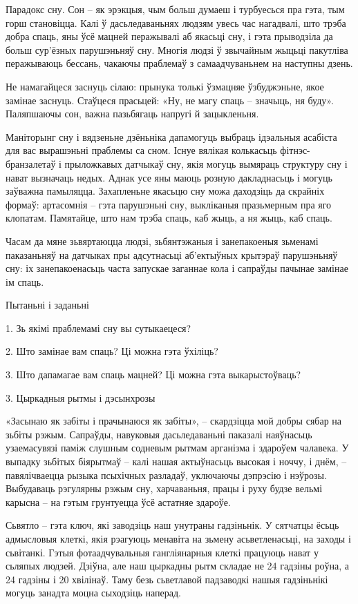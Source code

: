 Парадокс сну. Сон – як эрэкцыя, чым больш думаеш і турбуесься пра гэта, тым горш становіцца. Калі ў дасьледаваньнях людзям увесь час нагадвалі, што трэба добра спаць, яны ўсё мацней перажывалі аб якасьці сну, і гэта прыводзіла да больш сур'ёзных парушэньняў сну. Многія людзі ў звычайным жыцьці пакутліва перажываюць бессань, чакаючы праблемаў з самаадчуваньнем на наступны дзень.

Не намагайцеся заснуць сілаю: прынука толькі ўзмацняе ўзбуджэньне, якое замінае заснуць. Стаўцеся прасьцей: «Ну, не магу спаць – значыць, ня буду». Паляпшаючы сон, важна пазьбягаць напругі й зацыкленьня.

Маніторынг сну і вядзеньне дзёньніка дапамогуць выбраць ідэальныя асабіста для вас вырашэньні праблемы са сном. Існуе вялікая колькасьць фітнэс-бранзалетаў і прыложкавых датчыкаў сну, якія могуць вымяраць структуру сну і нават вызначаць недых. Аднак усе яны маюць розную дакладнасьць і могуць заўважна памыляцца. Захапленьне якасьцю сну можа даходзіць да скрайніх формаў: артасомнія – гэта парушэньні сну, выкліканыя празьмерным пра яго клопатам. Памятайце, што нам трэба спаць, каб жыць, а ня жыць, каб спаць.

Часам да мяне зьвяртаюцца людзі, зьбянтэжаныя і занепакоеныя зьменамі паказаньняў на датчыках пры адсутнасьці аб'ектыўных крытэраў парушэньняў сну: іх занепакоенасьць часта запускае заганнае кола і сапраўды пачынае замінае ім спаць.

Пытаньні і заданьні

1. Зь якімі праблемамі сну вы сутыкаецеся?

2. Што замінае вам спаць? Ці можна гэта ўхіліць?

3. Што дапамагае вам спаць мацней? Ці можна гэта выкарыстоўваць?


3. Цыркадныя рытмы і дэсынхрозы

«Засынаю як забіты і прачынаюся як забіты», – скардзіцца мой добры сябар на зьбіты рэжым. Сапраўды, навуковыя дасьледаваньні паказалі наяўнасьць узаемасувязі паміж слушным содневым рытмам арганізма і здароўем чалавека. У выпадку зьбітых біярытмаў – калі нашая актыўнасьць высокая і ноччу, і днём, – павялічваецца рызыка псыхічных разладаў, уключаючы дэпрэсію і нэўрозы. Выбудаваць рэгулярны рэжым сну, харчаваньня, працы і руху будзе вельмі карысна – на гэтым грунтуецца ўсё астатняе здароўе.

Сьвятло – гэта ключ, які заводзіць наш унутраны гадзіньнік. У сятчатцы ёсьць адмысловыя клеткі, якія рэагуюць менавіта на зьмену асьветленасьці, на заходы і сьвітанкі. Гэтыя фотаадчувальныя гангліянарныя клеткі працуюць нават у сьляпых людзей. Дзіўна, але наш цыркадны рытм складае не 24 гадзіны роўна, а 24 гадзіны і 20 хвілінаў. Таму безь сьветлавой падзаводкі нашыя гадзіньнікі могуць занадта моцна сыходзіць наперад.

